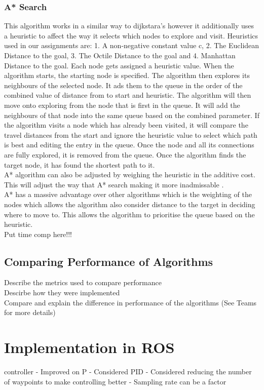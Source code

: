 \documentclass[a4paper,12pt]{article}
\begin{document}
			\subsubsection{A* Search}
				This algorithm works in a similar way to dijkstara’s however it additionally uses a heuristic to affect the way it selects which nodes to explore and visit. Heuristics used in our assignments are: 1. A non-negative constant value c, 2. The Euclidean Distance to the goal, 3. The Octile Distance to the goal and 4. Manhattan Distance to the goal. Each node gets assigned a heuristic value. When the algorithm starts, the starting node is specified. The algorithm then explores its neighbours of the selected node. It ads them to the queue in the order of the combined value of distance from to start and heuristic. The algorithm will then move onto exploring from the node that is first in the queue. It will add the neighbours of that node into the same queue based on the combined parameter. If the algorithm visits a node which has already been visited, it will compare the travel distances from the start and ignore the heuristic value to select which path is best and editing the entry in the queue. Once the node and all its connections are fully explored, it is removed from the queue. Once the algorithm finds the target node, it has found the shortest path to it. 
				\\
				A* algorithm can also be adjusted by weighing the heuristic in the additive cost. This will adjust the way that A* search making it more inadmissable .
				\\
				A* has a massive advantage over other algorithms which is the weighting of the nodes which allows the algorithm also consider distance to the target in deciding where to move to. This allows the algorithm to prioritise the queue based on the heuristic. 
				\\
				Put time comp here!!!
			\subsection{Comparing Performance of Algorithms}

		Describe the metrics used to compare performance \\
		Descirbe how they were implemented \\
		Compare and explain the difference in performance of the algorithms (See Teams for more details)


	\section{Implementation in ROS}
	controller 
	- Improved on P
	- Considered PID 
	- Considered reducing the number of waypoints to make controlling better 
	- Sampling rate can be a factor 
	
\end{document}
